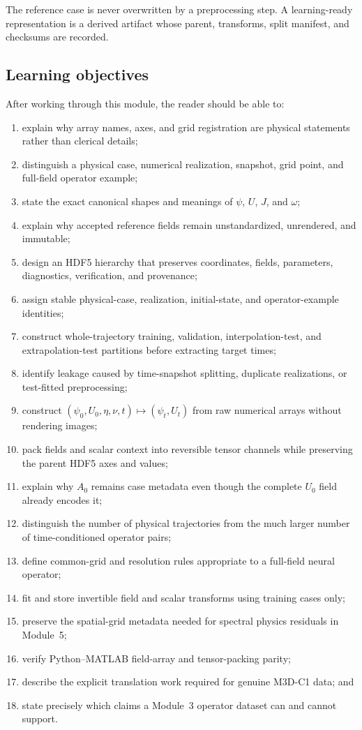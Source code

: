 \documentclass[11pt]{article}
\begin{document}
The reference case is never overwritten by a preprocessing step. A learning-ready representation is a derived artifact whose parent, transforms, split manifest, and checksums are recorded.

\subsection*{Learning objectives}

After working through this module, the reader should be able to:
\begin{enumerate}[label=\arabic*.]
  \item explain why array names, axes, and grid registration are physical statements rather than clerical details;
  \item distinguish a physical case, numerical realization, snapshot, grid point, and full-field operator example;
  \item state the exact canonical shapes and meanings of $\psi$, $U$, $J$, and $\omega$;
  \item explain why accepted reference fields remain unstandardized, unrendered, and immutable;
  \item design an HDF5 hierarchy that preserves coordinates, fields, parameters, diagnostics, verification, and provenance;
  \item assign stable physical-case, realization, initial-state, and operator-example identities;
  \item construct whole-trajectory training, validation, interpolation-test, and extrapolation-test partitions before extracting target times;
  \item identify leakage caused by time-snapshot splitting, duplicate realizations, or test-fitted preprocessing;
  \item construct $(\psi_0,U_0,\eta,\nu,t)\mapsto(\psi_t,U_t)$ from raw numerical arrays without rendering images;
  \item pack fields and scalar context into reversible tensor channels while preserving the parent HDF5 axes and values;
  \item explain why $A_0$ remains case metadata even though the complete $U_0$ field already encodes it;
  \item distinguish the number of physical trajectories from the much larger number of time-conditioned operator pairs;
  \item define common-grid and resolution rules appropriate to a full-field neural operator;
  \item fit and store invertible field and scalar transforms using training cases only;
  \item preserve the spatial-grid metadata needed for spectral physics residuals in Module~5;
  \item verify Python--MATLAB field-array and tensor-packing parity;
  \item describe the explicit translation work required for genuine M3D-C1 data; and
  \item state precisely which claims a Module~3 operator dataset can and cannot support.
\end{enumerate}
\end{document}
